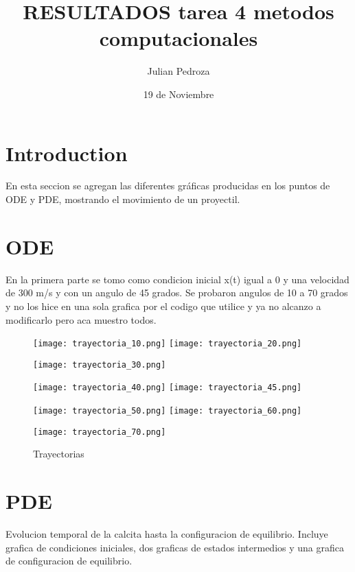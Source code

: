 \documentclass{article}
\title{RESULTADOS tarea 4 metodos computacionales}
\author{Julian Pedroza}
\date{19 de Noviembre}
\begin{document}
\maketitle

\section{Introduction}
En esta seccion se agregan las diferentes gráficas producidas en los puntos de ODE y PDE, mostrando el movimiento de un proyectil. 

\section{ODE}

En la primera parte se tomo como condicion inicial x(t) igual a 0 y una velocidad de 300 m/s y con un angulo de 45 grados.
Se probaron angulos de 10 a 70 grados y no los hice en una sola grafica por el codigo que utilice y ya no alcanzo a modificarlo pero aca muestro todos.
\begin{figure}[H]
\centering
\texttt{[image: trayectoria\_10.png]}
\texttt{[image: trayectoria\_20.png]}
\label{fig:Trayectorias}
\end{figure}

\begin{figure}[H]
\texttt{[image: trayectoria\_30.png]}
\label{fig:Trayectorias}
\end{figure}


\begin{figure}[H]
\texttt{[image: trayectoria\_40.png]}
\texttt{[image: trayectoria\_45.png]}
\label{fig:Trayectorias}
\end{figure}

\begin{figure}[H]
\texttt{[image: trayectoria\_50.png]}
\texttt{[image: trayectoria\_60.png]}
\label{fig:Trayectorias}
\end{figure}

\begin{figure}[H]
\texttt{[image: trayectoria\_70.png]}
\caption{Trayectorias}
\label{fig:Trayectorias}
\end{figure}

\section{PDE}
Evolucion temporal de la calcita hasta la configuracion de equilibrio. Incluye grafica de condiciones iniciales, dos graficas de estados intermedios y una grafica de configuracion de equilibrio.
\end{document}
